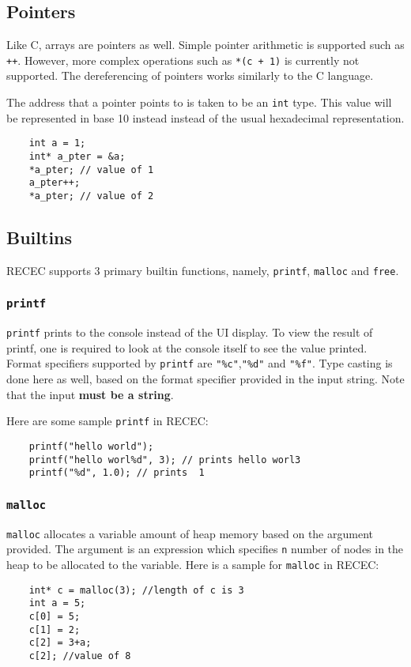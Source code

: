 \documentclass[a4paper]{article}
\begin{document}
\subsection{Pointers}

Like C, arrays are pointers as well. Simple pointer arithmetic is supported such as \texttt{++}. However, more complex operations such as \texttt{*(c + 1)} is currently not supported. The dereferencing of pointers works similarly to the C language. 

The address that a pointer points to is taken to be an \texttt{int} type. This value will be represented in base 10 instead instead of the usual hexadecimal representation. 

\begin{verbatim}
	int a = 1;
	int* a_pter = &a;
	*a_pter; // value of 1
	a_pter++;
	*a_pter; // value of 2
\end{verbatim}

\subsection{Builtins}

RECEC supports 3 primary builtin functions, namely, \texttt{printf}, \texttt{malloc} and \texttt{free}.

\subsubsection{\texttt{printf}}

\texttt{printf} prints to the console instead of the UI display. To view the result of printf, one is required to look at the console itself to see the value printed. Format specifiers supported by \texttt{printf} are \texttt{"\%c"},\texttt{"\%d"} and \texttt{"\%f"}. Type casting is done here as well, based on the format specifier provided in the input string. Note that the input \textbf{must be a string}. 

Here are some sample \texttt{printf} in RECEC:
\begin{verbatim}
	printf("hello world");
	printf("hello worl%d", 3); // prints hello worl3
	printf("%d", 1.0); // prints  1
\end{verbatim}

\subsubsection{\texttt{malloc}}

\texttt{malloc} allocates a variable amount of heap memory based on the argument provided. The 
argument is an expression which specifies \texttt{n} number of nodes in the heap to be allocated to the variable. 
Here is a sample for \texttt{malloc} in RECEC:
\begin{verbatim}
	int* c = malloc(3); //length of c is 3
    int a = 5;
    c[0] = 5;
    c[1] = 2;
    c[2] = 3+a;
    c[2]; //value of 8
\end{verbatim}
\end{document}
